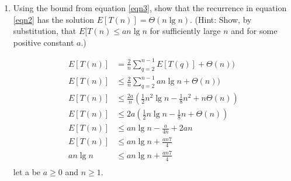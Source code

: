 \documentclass{article}
\begin{document}
\begin{enumerate}
\begin{enumerate}
      \item
        Using the bound from equation \ref{eqn3}, show that the
        recurrence in equation \ref{eqn2} has the solution
        $E[T(n)] = \Theta(n\lg n)$.  (Hint: Show, by substitution, that
        $E[T(n)\leq an\lg n$ for sufficiently large $n$ and for some
          positive constant $a$.) 
        
          \begin{align*}
        E[T(n)] &= 
        \frac{2}{n}\sum_{q=2}^{n - 1} E\left[ T(q)\right] + \Theta(n)) 
        \\
        E[T(n)] &\leq 
        \frac{2}{n}\sum_{q=2}^{n - 1} an\lg n + \Theta(n)) 
        \\
        E[T(n)] &\leq 
        \frac{2a}{n}(\frac{1}{2}n^2\lg n -
        \frac{1}{8} n^2 + n\Theta(n))
        \\
        E[T(n)] &\leq 
        2a(\frac{1}{2}n\lg n -
        \frac{1}{8} n + \Theta(n))
        \\
        E[T(n)] &\leq 
        an\lg n - \frac{a}{4n}  + 2an
        \\
        E[T(n)] &\leq 
        an\lg n + \frac{an7}{4} 
        \\
        an\lg n &\leq 
        an\lg n + \frac{an7}{4} 
        \\
        \end{align*}
        let a be $a \geq 0$ and $n \geq 1$.
    \end{enumerate}
  \end{enumerate}
  
  
\end{document}
